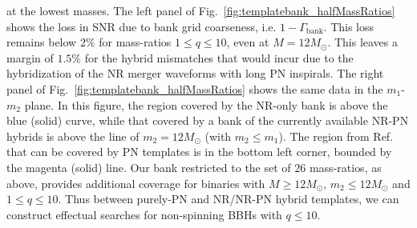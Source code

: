 at the lowest masses. The left panel of Fig.~\ref{fig:templatebank_halfMassRatios}
shows the loss in SNR due to bank grid coarseness, i.e. $1-\Gamma_\mathrm{bank}$. 
This loss remains below $2\%$ for mass-ratios $1\leq q\leq 10$, even at 
$M=12M_\odot$. This 
leaves a margin of $1.5\%$ for the hybrid mismatches that would incur due to 
the hybridization of the NR merger waveforms with long PN inspirals. The right 
panel of Fig.~\ref{fig:templatebank_halfMassRatios} shows the same data in the 
$m_1$-$m_2$ plane. In this figure, 
the region covered by the NR-only bank is above the blue (solid) curve, while 
that covered by a bank of the currently available NR-PN hybrids is above the
line of $m_2 = 12M_\odot$ (with $m_2\leq m_1$). The region from 
Ref.~\cite{Brown:2012nn,CompTemplates2009} that can be covered by PN templates 
is in the bottom
left corner, bounded by the magenta (solid) line. Our bank restricted to the
set of $26$ mass-ratios, as above, provides additional coverage for binaries
with $M\geq 12M_\odot$, $m_2\leq 12M_\odot$ and $1\leq q\leq 10$.
Thus between purely-PN and NR/NR-PN hybrid templates, we can construct 
effectual searches for non-spinning BBHs with $q\leq 10$.

